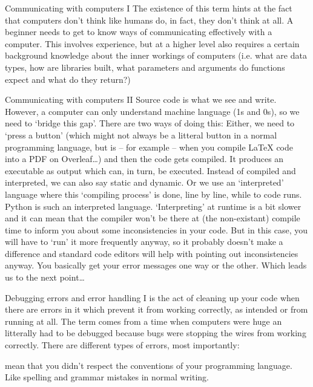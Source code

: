 \documentclass[10pt,a4paper]{article}
\begin{document}
\begin{multicols}{3}
\begin{textbox}{Communicating with computers I}
 The existence of this term  hints at the fact that computers don't think like humans do, in fact, they don't think at all. A beginner needs to get to know ways of communicating effectively with a computer. This involves experience, but at a higher level also requires a certain background knowledge about the inner workings of computers (i.e. what are data types, how are libraries built, what parameters and arguments do functions expect and what do they return?)
\end{textbox}

\begin{textbox}{Communicating with computers II}
Source code is what we see and write. However, a computer can only understand machine language (1s and 0s), so we need to `bridge this gap'. There are two ways of doing this: Either, we need to `press a button' (which might not always be a litteral button in a normal programming language, but is -- for example -- when you compile \LaTeX{} code into a PDF on Overleaf\dots) and then the code gets compiled. It produces an executable as output which can, in turn, be executed. Instead of compiled and interpreted, we can also say static and dynamic.
Or we use an `interpreted' language where this `compiling process' is done, line by line, while to code runs. Python is such an interpreted language. `Interpreting' at runtime is a bit slower and it can mean that the compiler won't be there at (the non-existant) compile time to inform you about some inconsistencies in your code. But in this case, you will have to `run' it more frequently anyway, so it probably doesn't make a difference and standard code editors will help with pointing out inconsistencies anyway. You basically get your error messages one way or the other. Which leads us to the next point\dots
\end{textbox}

\begin{textbox}{Debugging errors and error handling I}
 is the act of cleaning up your code when there are errors in it which prevent it from working correctly, as intended or from running at all. The term comes from a time when computers were huge an litterally had to be debugged because bugs were stopping the wires from working correctly. There are different types of errors, most importantly:

 mean that you didn't respect the conventions of your programming language. Like spelling and grammar mistakes in normal writing.


\end{textbox}
\end{multicols}
\end{document}
